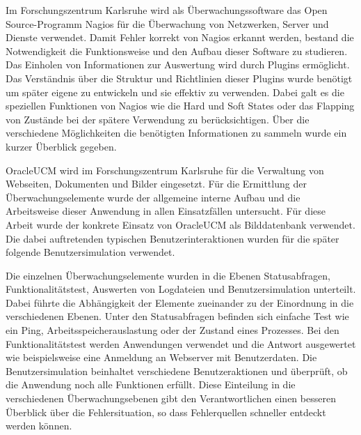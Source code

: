 Im Forschungszentrum Karlsruhe wird als Überwachungssoftware das Open Source-Programm Nagios für die Überwachung von Netzwerken, Server und Dienste verwendet.
Damit Fehler korrekt von Nagios erkannt werden, bestand die Notwendigkeit die Funktionsweise und den Aufbau dieser Software zu studieren.
Das Einholen von Informationen zur Auswertung wird durch Plugins ermöglicht.
Das Verständnis über die Struktur und Richtlinien dieser Plugins wurde benötigt um später eigene zu entwickeln und sie effektiv zu verwenden.
Dabei galt es die speziellen Funktionen von Nagios wie die Hard und Soft States oder das Flapping von Zustände bei der spätere Verwendung zu berücksichtigen.
Über die verschiedene Möglichkeiten die benötigten Informationen zu sammeln wurde ein kurzer Überblick gegeben.

\gls{OracleUCM} wird im Forschungszentrum Karlsruhe für die Verwaltung von Webseiten, Dokumenten und Bilder eingesetzt.
Für die Ermittlung der Überwachungselemente wurde der allgemeine interne Aufbau und die Arbeitsweise dieser Anwendung in allen Einsatzfällen untersucht.
Für diese Arbeit wurde der konkrete Einsatz von \gls{OracleUCM} als Bilddatenbank verwendet.
Die dabei auftretenden typischen Benutzerinteraktionen wurden für die später folgende Benutzersimulation verwendet.

Die einzelnen Überwachungselemente wurden in die Ebenen Statusabfragen, Funktionalitätstest, Auswerten von Logdateien und Benutzersimulation unterteilt.
Dabei führte die Abhängigkeit der Elemente zueinander zu der Einordnung in die verschiedenen Ebenen.
Unter den Statusabfragen befinden sich einfache Test wie ein Ping, Arbeitsspeicherauslastung oder der Zustand eines Prozesses.
Bei den Funktionalitätstest werden Anwendungen verwendet und die Antwort ausgewertet wie beispielsweise eine Anmeldung an Webserver mit Benutzerdaten.
Die Benutzersimulation beinhaltet verschiedene Benutzeraktionen und überprüft, ob die Anwendung noch alle Funktionen erfüllt.
Diese Einteilung in die verschiedenen Überwachungsebenen gibt den Verantwortlichen einen besseren Überblick über die Fehlersituation, so dass Fehlerquellen schneller entdeckt werden können.

